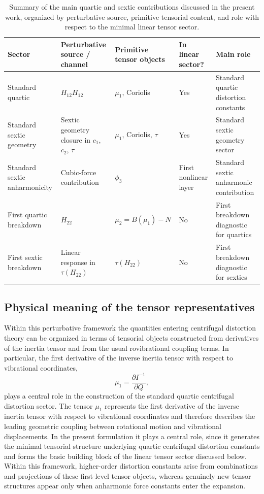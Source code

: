 \documentclass[aip,jcp,reprint,floatfix]{revtex4-2}
\begin{document}
\begin{table}[t]
\centering
\caption{Summary of the main quartic and sextic contributions discussed in the
present work, organized by perturbative source, primitive tensorial content,
and role with respect to the minimal linear tensor sector.}
\begin{tabular}{lllll}
\toprule
Sector & Perturbative source / channel & Primitive tensor objects & In linear sector? & Main role \\
\midrule
Standard quartic & $H_{12}H_{12}$ & $\mu_1$, Coriolis & Yes & Standard quartic distortion constants \\
Standard sextic geometry & Sextic geometry closure in $c_1$, $c_2$, $\tau$ & $\mu_1$, Coriolis, $\tau$ & Yes & Standard sextic geometry sector \\
Standard sextic anharmonicity & Cubic-force contribution & $\phi_3$ & First nonlinear layer & Standard sextic anharmonic contribution \\
First quartic breakdown & $H_{22}$ & $\mu_2 = B(\mu_1)-N$ & No & First breakdown diagnostic for quartics \\
First sextic breakdown & Linear response in $\tau(H_{22})$ & $\tau(H_{22})$ & No & First breakdown diagnostic for sextics \\
\bottomrule
\end{tabular}
\label{tab:channel_hierarchy_summary}
\end{table}


\subsection{Physical meaning of the tensor representatives}

Within this perturbative framework the quantities entering centrifugal
distortion theory can be organized in terms of tensorial objects
constructed from derivatives of the inertia tensor and from the usual
rovibrational coupling terms. In particular, the first derivative of
the inverse inertia tensor with respect to vibrational coordinates,
\begin{equation}
\mu_1 = \frac{\partial I^{-1}}{\partial Q},
\end{equation}
plays a central role in the construction of the standard quartic
centrifugal distortion sector.
The tensor $\mu_1$ represents the first derivative of the inverse
inertia tensor with respect to vibrational coordinates and therefore
describes the leading geometric coupling between rotational motion and
vibrational displacements. In the present formulation it plays a
central role, since it generates the minimal tensorial structure
underlying quartic centrifugal distortion constants and forms the basic
building block of the linear tensor sector discussed below. Within
this framework, higher-order distortion constants arise from
combinations and projections of these first-level tensor objects,
whereas genuinely new tensor structures appear only when anharmonic
force constants enter the expansion.
\end{document}
